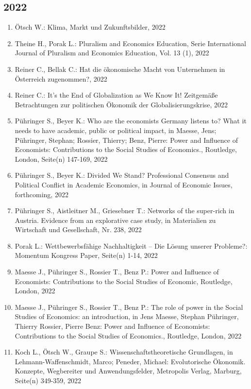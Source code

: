 \subsection*{2022}
\begin{enumerate}
    	 \item Ötsch W.: Klima, Markt und Zukunftsbilder, 2022
	 \item Theine H., Porak L.: Pluralism and Economics Education, Serie International Journal of Pluralism and Economics Education, Vol. 13 (1), 2022
	 \item Reiner C., Bellak C.: Hat die ökonomische Macht von Unternehmen in Österreich zugenommen?, 2022
	 \item Reiner C.: It’s the End of Globalization as We Know It! Zeitgemäße Betrachtungen zur politischen Ökonomik der Globalisierungskrise, 2022
	 \item Pühringer S., Beyer K.: Who are the economists Germany listens to? What it needs to have academic, public or political impact, in Maesse, Jens; Pühringer, Stephan; Rossier, Thierry; Benz, Pierre: Power and Influence of Economists: Contributions to the Social Studies of Economics., Routledge, London, Seite(n) 147-169, 2022
	 \item Pühringer S., Beyer K.: Divided We Stand? Professional Consensus and Political Conflict in Academic Economics, in Journal of Economic Issues, forthcoming, 2022
	 \item Pühringer S., Aistleitner M., Griesebner T.: Networks of the super-rich in Austria. Evidence from an explorative case study, in Materialien zu Wirtschaft und Gesellschaft, Nr. 238, 2022
	 \item Porak L.: Wettbewerbsfähige Nachhaltigkeit – Die Lösung unserer Probleme?: Momentum Kongress Paper, Seite(n) 1-14, 2022
	 \item Maesse J., Pühringer S., Rossier T., Benz P.: Power and Influence of Economists: Contributions to the Social Studies of Economic, Routledge, London, 2022
	 \item Maesse J., Pühringer S., Rossier T., Benz P.: The role of power in the Social Studies of Economics: an introduction, in Jens Maesse, Stephan Pühringer, Thierry Rossier,  Pierre Benz: Power and Influence of Economists: Contributions to the Social Studies of Economics., Routledge, London, 2022
	 \item Koch L., Ötsch W., Graupe S.: Wissenschaftstheoretische Grundlagen, in Lehmann-Waffenschmidt, Marco; Peneder, Michael: Evolutorische Ökonomik. Konzepte, Wegbereiter und Anwendungsfelder, Metropolis Verlag, Marburg, Seite(n) 349-359, 2022

\end{enumerate}
